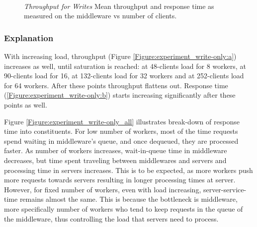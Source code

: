 \documentclass[11pt,a4paper]{article}
\begin{document}
\begin{figure}[ht!]
	\centering	
	\hfill
	\\
	\caption{\textit{Throughput for Writes} Mean throughput and response time as measured on the middleware vs number of clients.}
	\label{Figure:experiment_write-only}	
\end{figure}

\subsubsection{Explanation}

With increasing load, throughput (Figure \ref{Figure:experiment_write-only:a}) increases as well, until saturation is reached: at 48-clients load for 8 workers, at 90-clients load for 16, at 132-clients load for 32 workers and at 252-clients load for 64 workers. After these points throughput flattens out. Response time (\ref{Figure:experiment_write-only:b}) starts increasing significantly after these points as well.

Figure \ref{Figure:experiment_write-only_all} illustrates break-down of response time into constituents. For low number of workers, most of the time requests spend waiting in middleware's queue, and once dequeued, they are processed faster. As number of workers increases, wait-in-queue time in middleware decreases, but time spent traveling between middlewares and servers and processing time in servers increases. This is to be expected, as more workers push more requests towards servers resulting in longer processing times at server. However, for fixed number of workers, even with load increasing, server-service-time remains almost the same. This is because the bottleneck is middleware, more specifically number of workers who tend to keep requests in the queue of the middleware, thus controlling the load that servers need to process.
\end{document}
